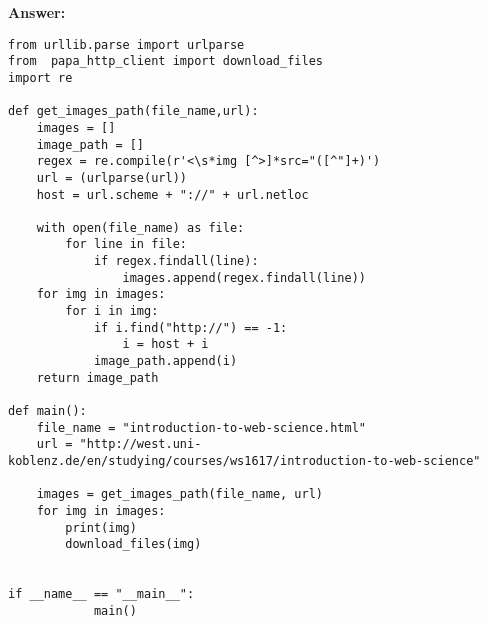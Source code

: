 \documentclass{WeSTassignment}
\begin{document}
\textbf{Answer: } \\
\begin{lstlisting}
from urllib.parse import urlparse
from  papa_http_client import download_files
import re

def get_images_path(file_name,url):
    images = []
    image_path = []
    regex = re.compile(r'<\s*img [^>]*src="([^"]+)')
    url = (urlparse(url))
    host = url.scheme + "://" + url.netloc

    with open(file_name) as file:
        for line in file:
            if regex.findall(line):
                images.append(regex.findall(line))
    for img in images:
        for i in img:
            if i.find("http://") == -1:
                i = host + i
            image_path.append(i)
    return image_path

def main():
    file_name = "introduction-to-web-science.html"
    url = "http://west.uni-koblenz.de/en/studying/courses/ws1617/introduction-to-web-science"

    images = get_images_path(file_name, url)
    for img in images:
        print(img)
        download_files(img)


if __name__ == "__main__":
            main()

\end{lstlisting}








\makefooter
\end{document}
